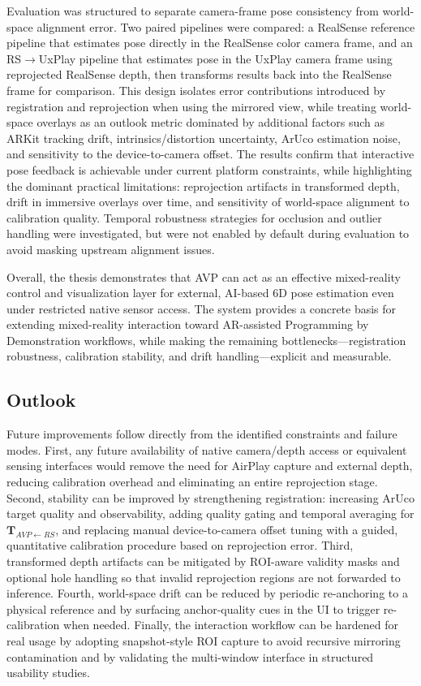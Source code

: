 Evaluation was structured to separate camera-frame pose consistency from world-space alignment error. Two paired pipelines were compared: a RealSense reference pipeline that estimates pose directly in the RealSense color camera frame, and an RS$\rightarrow$UxPlay pipeline that estimates pose in the UxPlay camera frame using reprojected RealSense depth, then transforms results back into the RealSense frame for comparison. This design isolates error contributions introduced by registration and reprojection when using the mirrored view, while treating world-space overlays as an outlook metric dominated by additional factors such as ARKit tracking drift, intrinsics/distortion uncertainty, ArUco estimation noise, and sensitivity to the device-to-camera offset. The results confirm that interactive pose feedback is achievable under current platform constraints, while highlighting the dominant practical limitations: reprojection artifacts in transformed depth, drift in immersive overlays over time, and sensitivity of world-space alignment to calibration quality. Temporal robustness strategies for occlusion and outlier handling were investigated, but were not enabled by default during evaluation to avoid masking upstream alignment issues.

Overall, the thesis demonstrates that AVP can act as an effective mixed-reality control and visualization layer for external, AI-based 6D pose estimation even under restricted native sensor access. The system provides a concrete basis for extending mixed-reality interaction toward AR-assisted Programming by Demonstration workflows, while making the remaining bottlenecks—registration robustness, calibration stability, and drift handling—explicit and measurable.

\subsection{Outlook}

Future improvements follow directly from the identified constraints and failure modes. First, any future availability of native camera/depth access or equivalent sensing interfaces would remove the need for AirPlay capture and external depth, reducing calibration overhead and eliminating an entire reprojection stage. Second, stability can be improved by strengthening registration: increasing ArUco target quality and observability, adding quality gating and temporal averaging for $\mathbf{T}_{AVP \leftarrow RS}$, and replacing manual device-to-camera offset tuning with a guided, quantitative calibration procedure based on reprojection error. Third, transformed depth artifacts can be mitigated by ROI-aware validity masks and optional hole handling so that invalid reprojection regions are not forwarded to inference. Fourth, world-space drift can be reduced by periodic re-anchoring to a physical reference and by surfacing anchor-quality cues in the UI to trigger re-calibration when needed. Finally, the interaction workflow can be hardened for real usage by adopting snapshot-style ROI capture to avoid recursive mirroring contamination and by validating the multi-window interface in structured usability studies.

